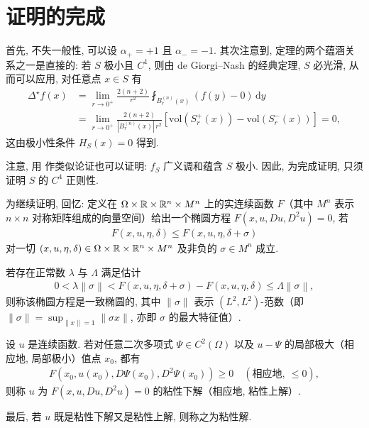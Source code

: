 \section*{证明的完成}

首先, 不失一般性, 可以设 $\alpha_+ = +1$ 且 $\alpha_- = -1$. 其次注意到, 定理的两个蕴涵关系之一是直接的: 若 $S$ 极小且 $C^1$, 则由 de Giorgi--Nash 的经典定理, $S$ 必光滑, 从而可以应用, 对任意点 $x \in S$ 有
\begin{align*}
  \Delta^{\star}f(x)
  &=\lim_{r\to0^{+}}\frac{2(n+2)}{r^{2}}\fint_{B_{r}^{(n)}(x)}(f(y)-0)\,\mathrm{d}y\\
  &=\lim_{r\to0^{+}}\frac{2(n+2)}{|B_{r}^{(n)}(x)|\,r^{2}}
   [\mathrm{vol}(S_{r}^{+}(x))-\mathrm{vol}(S_{r}^{-}(x))]=0,
\end{align*}
这由极小性条件 $H_{S}(x)=0$ 得到.

注意, 用 作类似论证也可以证明: $f_S$ 广义调和蕴含 $S$ 极小. 因此, 为完成证明, 只须证明 $S$ 的 $C^4$ 正则性.

为继续证明, 回忆: 定义在 $\Omega \times \mathbb{R} \times \mathbb{R}^n \times M^n$ 上的实连续函数 $F$（其中 $M^n$ 表示 $n \times n$ 对称矩阵组成的向量空间）给出一个椭圆方程 $F(x, u, Du, D^2u) = 0$, 若
\begin{align*}
  F(x,u,\eta,\delta)\leq F(x,u,\eta,\delta+\sigma)
\end{align*}
对一切 $(x, u, \eta, \delta) \in \Omega \times \mathbb{R} \times \mathbb{R}^n \times M^n$ 及非负的 $\sigma \in M^n$ 成立.

若存在正常数 $\lambda$ 与 $\Lambda$ 满足估计
\begin{align*}
  0<\lambda\left\|\sigma\right\|<F(x,u,\eta,\delta+\sigma)-F(x,u,\eta,\delta)\leq\Lambda\left\|\sigma\right\|,
\end{align*}
则称该椭圆方程是一致椭圆的, 其中 $\|\sigma\|$ 表示 $(L^2, L^2)$-范数（即 $\|\sigma\| = \sup_{\|x\|=1} \|\sigma x\|$, 亦即 $\sigma$ 的最大特征值）.

\begin{definition}\label{def:1.8}
设 $u$ 是连续函数. 若对任意二次多项式 $\Psi \in C^2(\Omega)$ 以及 $u - \Psi$ 的局部极大（相应地, 局部极小）值点 $x_0$, 都有
\begin{align*}
  F(x_{0},u(x_{0}),D\Psi(x_{0}),D^{2}\Psi(x_{0}))\geq 0\quad(\text{相应地},\ \leq 0),
\end{align*}
则称 $u$ 为 $F(x,u,Du,D^2u) = 0$ 的粘性下解（相应地, 粘性上解）.

最后, 若 $u$ 既是粘性下解又是粘性上解, 则称之为粘性解.
\end{definition}

